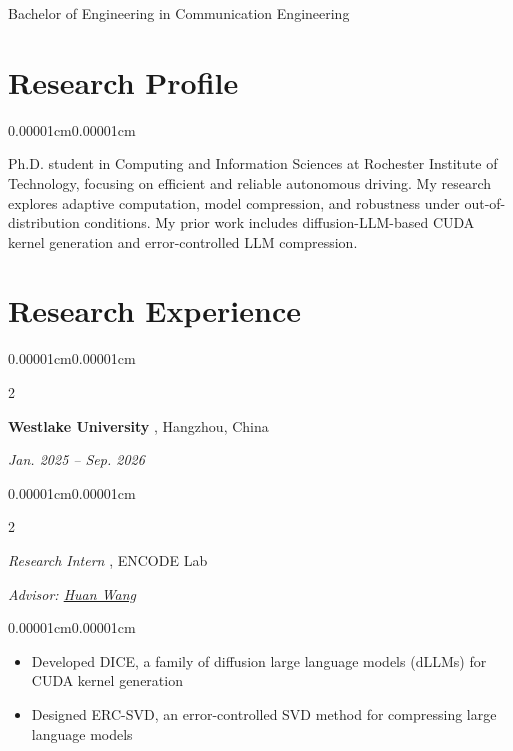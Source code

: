\documentclass[10pt, letterpaper]{article}
\newcommand{\institution}[1]{%
    {\fontsize{10.8pt}{13pt}\selectfont\bfseries #1}%
}
\newcommand{\entrydate}[1]{%
    {\small\itshape #1}%
}
\newcommand{\advisor}[1]{%
    {\small\itshape Advisor: #1}%
}
\newcommand{\role}[1]{%
    {\itshape #1}%
}
\newenvironment{highlights}{
    \begin{itemize}[
        topsep=0.08cm,
        parsep=0.06cm,
        partopsep=0pt,
        itemsep=0pt,
        leftmargin=10pt
    ]
}{
    \end{itemize}
}
\newenvironment{onecolentry}{
    \begin{adjustwidth}{0.00001cm}{0.00001cm}
}{
    \end{adjustwidth}
}
\newenvironment{twocolentry}[2][]{
    \onecolentry
    \def\secondColumn{#2}
    \setcolumnwidth{\fill,4cm}
    \begin{paracol}{2}
}{
    \switchcolumn
    \raggedleft
    \secondColumn
    \end{paracol}
    \endonecolentry
}
\begin{document}
\vspace{0.08cm}

\hspace{0.10cm}%
Bachelor of Engineering in Communication Engineering

\section{Research Profile}

\begin{onecolentry}
    Ph.D. student in Computing and Information Sciences at Rochester Institute of Technology,
    focusing on efficient and reliable autonomous driving. My research explores adaptive
    computation, model compression, and robustness under out-of-distribution conditions.
    My prior work includes diffusion-LLM-based CUDA kernel generation and error-controlled
    LLM compression.
\end{onecolentry}

\section{Research Experience}

\begin{twocolentry}{
    \entrydate{Jan. 2025 -- Sep. 2026}
}
    \institution{Westlake University}, Hangzhou, China
\end{twocolentry}

\vspace{0.08cm}

\begin{twocolentry}{
    \advisor{\href{https://scholar.google.com/citations?user=0-On0y4AAAAJ\&hl=en}{Huan Wang}}
}
    \role{Research Intern}, ENCODE Lab
\end{twocolentry}

\vspace{0.08cm}

\begin{onecolentry}
    \begin{highlights}
        \item Developed DICE, a family of diffusion large language models (dLLMs) for CUDA kernel generation
        \item Designed ERC-SVD, an error-controlled SVD method for compressing large language models
    \end{highlights}
\end{onecolentry}
\end{document}
